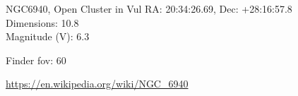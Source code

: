 \begin{block}{NGC6940, Open Cluster in Vul}
    RA: 20:34:26.69, Dec: +28:16:57.8 \\ 
    Dimensions: 10.8 \\ 
    Magnitude (V): 6.3



    Finder fov: 60 

    \url{https://en.wikipedia.org/wiki/NGC_6940} 
\end{block}